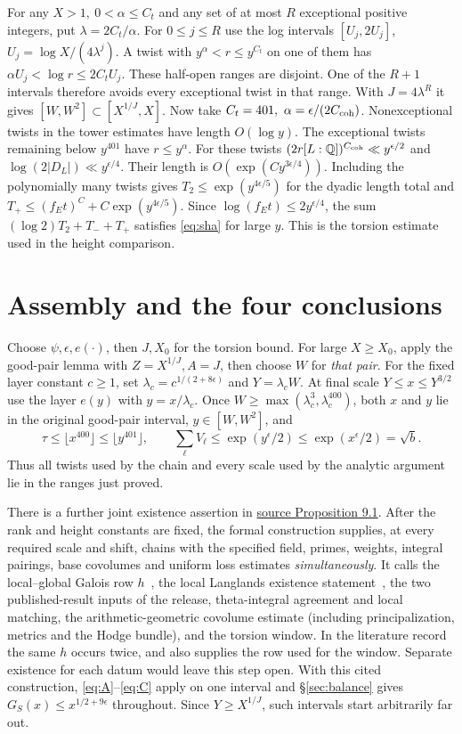 \documentclass[letterpaper,11pt]{article}
\newcommand{\QQ}{\mathbb Q}
\newcommand{\paperpage}[2]{\href{https://zenodo.org/records/24413008/files/alpoge-rh-exposition.pdf\#page=#1}{#2}}
\begin{document}
For any \(X>1,\ 0<\alpha\le C_t\) and any set of at most \(R\) exceptional positive integers, put \(\lambda=2C_t/\alpha\). For \(0\le j\le R\) use the log intervals \([U_j,2U_j]\), \(U_j=\log X/(4\lambda^j)\). A twist with \(y^\alpha<r\le y^{C_t}\) on one of them has \(\alpha U_j<\log r\le2C_tU_j\). These half-open ranges are disjoint. One of the \(R+1\) intervals therefore avoids every exceptional twist in that range. With \(J=4\lambda^R\) it gives \([W,W^2]\subset[X^{1/J},X]\). Now take \(C_t=401,\ \alpha=\epsilon/(2C_{\rm coh})\). Nonexceptional twists in the tower estimates have length \(O(\log y)\). The exceptional twists remaining below \(y^{401}\) have \(r\le y^\alpha\). For these twists \((2r[L:\QQ])^{C_{\rm coh}}\ll y^{\epsilon/2}\) and \(\log(2|D_L|)\ll y^{\epsilon/4}\). Their length is \(O(\exp(Cy^{3\epsilon/4}))\). Including the polynomially many twists gives \(T_2\le\exp(y^{4\epsilon/5})\) for the dyadic length total and \(T_+\le(f_E t)^C+C\exp(y^{4\epsilon/5})\). Since \(\log(f_Et)\le2y^{\epsilon/4}\), the sum \((\log 2)T_2+T_-+T_+\) satisfies \eqref{eq:sha} for large \(y\). This is the torsion estimate used in the height comparison.

\section{Assembly and the four conclusions}\label{sec:assembly}
Choose \(\psi,\epsilon,e(\cdot)\), then \(J,X_0\) for the torsion bound. For large \(X\ge X_0\), apply the good-pair lemma with \(Z=X^{1/J}, A=J\), then choose \(W\) for \emph{that pair}. For the fixed layer constant \(c\ge1\), set \(\lambda_c=c^{1/(2+8\epsilon)}\) and \(Y=\lambda_c W\). At final scale \(Y\le x\le Y^{3/2}\) use the layer \(e(y)\) with \(y=x/\lambda_c\). Once \(W\ge\max(\lambda_c^3,\lambda_c^{400})\), both \(x\) and \(y\) lie in the original good-pair interval, \(y\in[W,W^2]\), and
\[
 \tau\le\lfloor x^{400}\rfloor\le\lfloor y^{401}\rfloor,\qquad
 \sum_\ell V_\ell\le\exp(y^\epsilon/2)\le\exp(x^\epsilon/2)=\sqrt b .
\]
Thus all twists used by the chain and every scale used by the analytic argument lie in the ranges just proved.

There is a further joint existence assertion in \paperpage{34}{source Proposition 9.1}. After the rank and height constants are fixed, the formal construction supplies, at every required scale and shift, chains with the specified field, primes, weights, integral pairings, base covolumes and uniform loss estimates \emph{simultaneously}. It calls the local--global Galois row \(h\)~\cite{chenevier,shin}, the local Langlands existence statement~\cite{ht,henniart,scholze}, the two published-result inputs of the release, theta-integral agreement and local matching, the arithmetic-geometric covolume estimate (including principalization, metrics and the Hodge bundle), and the torsion window. In the literature record the same \(h\) occurs twice, and also supplies the row used for the window. Separate existence for each datum would leave this step open. With this cited construction, \eqref{eq:A}--\eqref{eq:C} apply on one interval and \S\ref{sec:balance} gives \(G_S(x)\le x^{1/2+9\epsilon}\) throughout. Since \(Y\ge X^{1/J}\), such intervals start arbitrarily far out.
\end{document}
